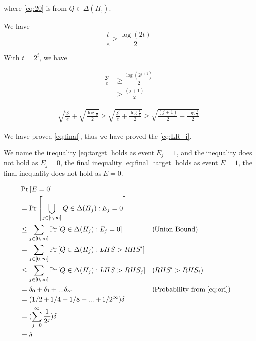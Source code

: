 \documentclass{article}
\begin{document}
where \eqref{eq:20} is from $Q \in \Delta(H_j)$.

We have 
\begin{equation}
    \frac{t}{e} \geq \frac{\log (2 t)}{2}
\end{equation}

With $t = 2^i$, we have

\begin{align}
    \frac{2^j}{e} 
    &\geq \frac{\log (2^{j+1})}{2} \\
    &\geq \frac{(j+1)}{2}
\end{align}

\begin{align}
    \sqrt{\frac{2^j}{e}}   + \sqrt{\frac{\log \frac{1}{\delta}}{2 }} 
    \geq 
    \sqrt{\frac{2^j}{e} + \frac{ \log \frac{1}{\delta}}{2 }}  
    \geq
    \sqrt{\frac{(j+1)}{2} + \frac{ \log \frac{1}{\delta}}{2 }} \label{eq:final}
\end{align}


We have proved \eqref{eq:final}, thus we have proved the \eqref{eq:LR_i}.

We name the inequality \eqref{eq:target} holds as event $E_j = 1$, and the inequality does not hold as $E_j = 0$, the final inequality \eqref{eq:final_target} holds as event $E=1$, the final inequality does not hold as $E=0$.

\begin{align}
&\operatorname{Pr}\left[E=0\right] \\
&=\operatorname{Pr}\left[\bigcup_{j \in [0,\infty]} Q \in \Delta(H_j): E_j=0 \right] \\
&\leq\sum_{j \in [0,\infty]} \operatorname{Pr}\left[ Q \in \Delta(H_j) :E_j=0 \right] && \text{(Union Bound)}\\
&=\sum_{j \in [0,\infty]} \operatorname{Pr}\left[ Q \in \Delta(H_j): LHS > RHS' \right] \\
&\leq\sum_{j \in [0,\infty]} \operatorname{Pr}\left[ Q \in \Delta(H_j) : LHS > RHS_j \right] && (RHS' > RHS_i) \\ 
&= \delta_0 + \delta_1 + ... \delta_{\infty} && \text{(Probability from \eqref{eq:ori})} \\
&= (1/2 + 1/4 + 1/8 + ... + 1/2^{\infty}) \delta  \\
&= (\sum_{j=0}^{\infty} \frac{1}{2^j})\delta \\
&= \delta
\end{align}
\end{document}
